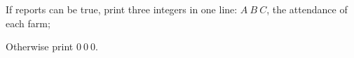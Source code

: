 If reports can be true, print three integers in one line: $A\ B\ C$, the attendance of each farm;

Otherwise print $0\ 0\ 0$.
